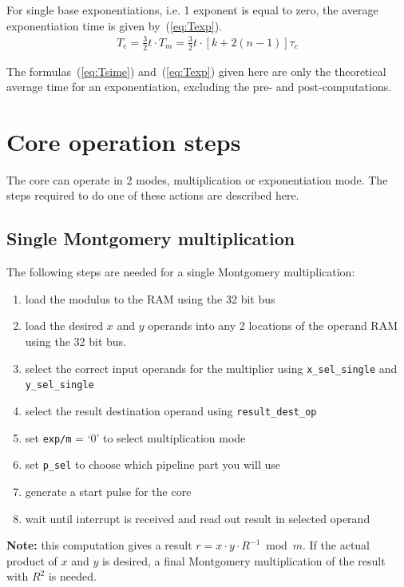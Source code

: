 For single base exponentiations, i.e. 1 exponent is equal to zero, the average exponentiation time is given by~(\ref{eq:Texp}).
\begin{align}\label{eq:Texp}
T_{e} = \frac{3}{2} t \cdot T_{m} = \frac{3}{2}t \cdot [k + 2(n - 1)] \tau_c 
\end{align}

The formulas~(\ref{eq:Tsime}) and~(\ref{eq:Texp}) given here are only the theoretical average time for an exponentiation,
excluding the pre- and post-computations.


\section{Core operation steps}
The core can operate in 2 modes, multiplication or exponentiation mode. The steps required to do one of these actions
are described here.
\subsection{Single Montgomery multiplication}
The following steps are needed for a single Montgomery multiplication:
\begin{enumerate}
  	\item load the modulus to the RAM using the 32 bit bus
	\item load the desired $x$ and $y$ operands into any 2 locations of the operand RAM using the 32 bit bus.
	\item select the correct input operands for the multiplier using \verb|x_sel_single| and \verb|y_sel_single|
	\item select the result destination operand using \verb|result_dest_op|
	\item set \verb|exp/m| = `0' to select multiplication mode
	\item set \verb|p_sel| to choose which pipeline part you will use
	\item generate a start pulse for the core
	\item wait until interrupt is received and read out result in selected operand
\end{enumerate}

\textbf{Note:} this computation gives a result \( r = x \cdot y \cdot R^{-1} \bmod m\). If the actual product of $x$ and $y$ is
desired, a final Montgomery multiplication of the result with $R^{2}$ is needed.

